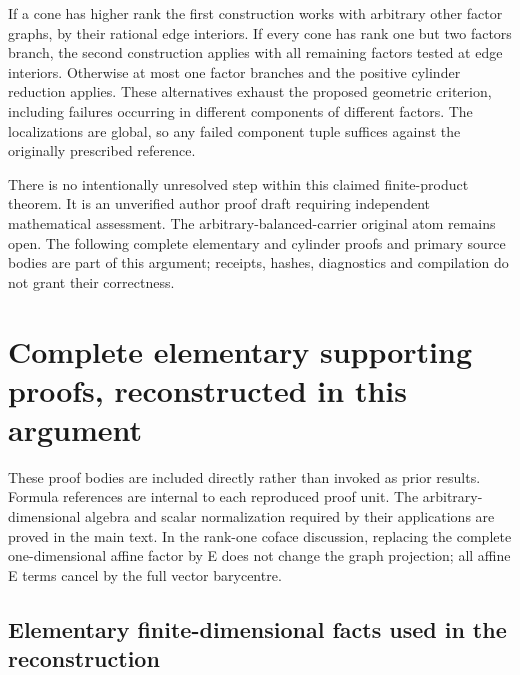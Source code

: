 \documentclass[
  11pt,
]{article}
\begin{document}
If a cone has higher rank the first construction works with arbitrary
other factor graphs, by their rational edge interiors. If every cone has
rank one but two factors branch, the second construction applies with
all remaining factors tested at edge interiors. Otherwise at most one
factor branches and the positive cylinder reduction applies. These
alternatives exhaust the proposed geometric criterion, including
failures occurring in different components of different factors. The
localizations are global, so any failed component tuple suffices against
the originally prescribed reference.

There is no intentionally unresolved step within this claimed
finite-product theorem. It is an unverified author proof draft requiring
independent mathematical assessment. The arbitrary-balanced-carrier
original atom remains open. The following complete elementary and
cylinder proofs and primary source bodies are part of this argument;
receipts, hashes, diagnostics and compilation do not grant their
correctness.

\section{Complete elementary supporting proofs, reconstructed in this
argument}\label{complete-elementary-supporting-proofs-reconstructed-in-this-argument}

These proof bodies are included directly rather than invoked as prior
results. Formula references are internal to each reproduced proof unit.
The arbitrary-dimensional algebra and scalar normalization required by
their applications are proved in the main text. In the rank-one coface
discussion, replacing the complete one-dimensional affine factor by E
does not change the graph projection; all affine E terms cancel by the
full vector barycentre.

\subsection{Elementary finite-dimensional facts used in the
reconstruction}\label{elementary-finite-dimensional-facts-used-in-the-reconstruction}
\end{document}
